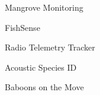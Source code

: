 \item Mangrove Monitoring
\item FishSense
\item Radio Telemetry Tracker
\item Acoustic Species ID
\item Baboons on the Move
